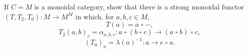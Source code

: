 If $C = M$ is a monoidal category, show that there is a strong monoidal functor $(T, T_2, T_0) : M \to M^M$ in which, for $a, b, c \in M$,
$$
T(a) = a \mathbin{\square} -,
$$
$$
T_2(a, b)_c = \alpha_{a,b,c} : a \mathbin{\square} (b \mathbin{\square} c) \to (a \mathbin{\square} b) \mathbin{\square} c,
$$
$$
(T_0)_a = \lambda(a)^{-1} : a \to e \mathbin{\square} a.
$$
